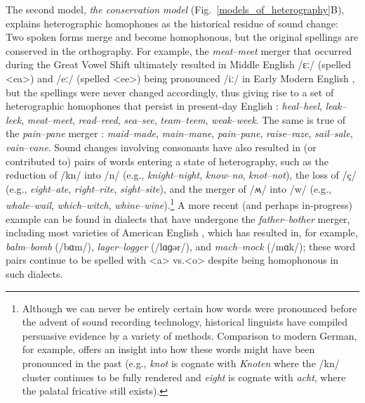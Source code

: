 \documentclass[doc,biblatex]{apa7}
\begin{document}
The second model, \textit{the conservation model} (Fig.~\ref{models_of_heterography}B), explains heterographic homophones as the historical residue of sound change: Two spoken forms merge and become homophonous, but the original spellings are conserved in the orthography. For example, the \textit{meat}--\textit{meet} merger that occurred during the Great Vowel Shift ultimately resulted in Middle English /ɛː/ (spelled <ea>) and /eː/ (spelled <ee>) being pronounced /iː/ in Early Modern English \parencite{Lass:2000}, but the spellings were never changed accordingly, thus giving rise to a set of heterographic homophones that persist in present-day English \parencite[pp.~140--141]{Wells:1982}: \textit{heal}--\textit{heel}, \textit{leak}--\textit{leek}, \textit{meat}--\textit{meet}, \textit{read}--\textit{reed}, \textit{sea}--\textit{see}, \textit{team}--\textit{teem}, \textit{weak}--\textit{week}. The same is true of the \textit{pain}--\textit{pane} merger \parencite[pp.~141--142]{Wells:1982}: \textit{maid}--\textit{made}, \textit{main}--\textit{mane}, \textit{pain}--\textit{pane}, \textit{raise}--\textit{raze}, \textit{sail}--\textit{sale}, \textit{vain}--\textit{vane}. Sound changes involving consonants have also resulted in (or contributed to) pairs of words entering a state of heterography, such as the reduction of /kn/ into /n/ (e.g., \textit{knight}--\textit{night}, \textit{know}--\textit{no}, \textit{knot}--\textit{not}), the loss of /ç/ (e.g., \textit{eight}--\textit{ate}, \textit{right}--\textit{rite}, \textit{sight}--\textit{site}), and the merger of /ʍ/ into /w/ (e.g., \textit{whale}--\textit{wail}, \textit{which}--\textit{witch}, \textit{whine}--\textit{wine}).\footnote{Although we can never be entirely certain how words were pronounced before the advent of sound recording technology, historical linguists have compiled persuasive evidence by a variety of methods. Comparison to modern German, for example, offers an insight into how these words might have been pronounced in the past (e.g., \textit{knot} is cognate with \textit{Knoten} where the /kn/ cluster continues to be fully rendered and \textit{eight} is cognate with \textit{acht}, where the palatal fricative still exists).} A more recent (and perhaps in-progress) example can be found in dialects that have undergone the \textit{father}--\textit{bother} merger, including most varieties of American English \parencite[p.~169]{Labov:2005}, which has resulted in, for example, \textit{balm}--\textit{bomb} (/bɑm/), \textit{lager}--\textit{logger} (/lɑɡər/), and \textit{mach}--\textit{mock} (/mɑk/); these word pairs continue to be spelled with <a> vs.\@ <o> despite being homophonous in such dialects.
\end{document}
